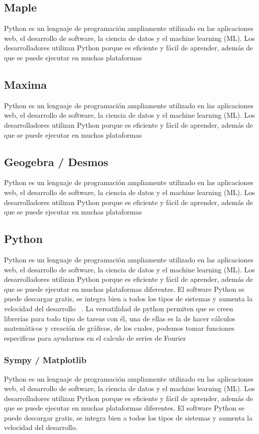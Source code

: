 \subsection{Maple}
Python es un lenguaje de programación ampliamente utilizado en las aplicaciones web, el desarrollo de software, la ciencia de datos y el machine learning (ML). Los desarrolladores utilizan Python porque es eficiente y fácil de aprender, además de que se puede ejecutar en muchas plataformas

\subsection{Maxima}
Python es un lenguaje de programación ampliamente utilizado en las aplicaciones web, el desarrollo de software, la ciencia de datos y el machine learning (ML). Los desarrolladores utilizan Python porque es eficiente y fácil de aprender, además de que se puede ejecutar en muchas plataformas

\subsection{Geogebra / Desmos}
Python es un lenguaje de programación ampliamente utilizado en las aplicaciones web, el desarrollo de software, la ciencia de datos y el machine learning (ML). Los desarrolladores utilizan Python porque es eficiente y fácil de aprender, además de que se puede ejecutar en muchas plataformas

\subsection{Python}
Python es un lenguaje de programación ampliamente utilizado en las aplicaciones web, el desarrollo de software, la ciencia de datos y el machine learning (ML). Los desarrolladores utilizan Python porque es eficiente y fácil de aprender, además de que se puede ejecutar en muchas plataformas diferentes. El software Python se puede descargar gratis, se integra bien a todos los tipos de sistemas y aumenta la velocidad del desarrollo ~\cite{amazonPython}.
La versatilidad de python permiten que se creen librerías para todo tipo de tareas con él, una de ellas es la de hacer cálculos matemáticos y creación de gráficos, de los cuales, podemos tomar funciones especificas para ayudarnos en el calculo de series de Fourier

\subsubsection{Sympy / Matplotlib}
Python es un lenguaje de programación ampliamente utilizado en las aplicaciones web, el desarrollo de software, la ciencia de datos y el machine learning (ML). Los desarrolladores utilizan Python porque es eficiente y fácil de aprender, además de que se puede ejecutar en muchas plataformas diferentes. El software Python se puede descargar gratis, se integra bien a todos los tipos de sistemas y aumenta la velocidad del desarrollo.

